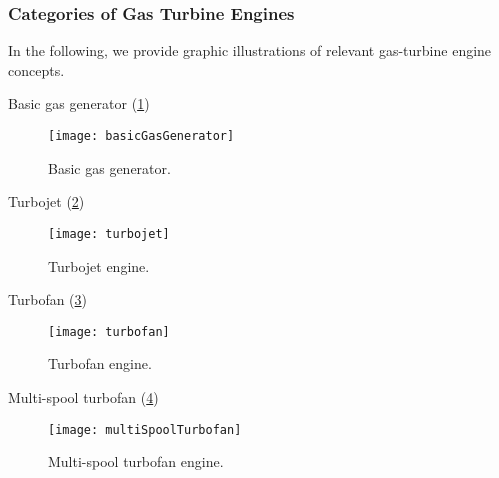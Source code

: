 \subsubsection{Categories of Gas Turbine Engines}
In the following, we provide graphic illustrations of relevant gas-turbine engine concepts.
\begin{itemizePacked}
\item Basic gas generator (\cref{FIG_BASIC_GAS_GENERATOR})

\begin{figure}[!h!]
 \centering
    {\texttt{[image: basicGasGenerator]}}
    \caption{\label{FIG_BASIC_GAS_GENERATOR}Basic gas generator.}
\end{figure}

\item Turbojet (\cref{FIG_TURBOJET})

\begin{figure}[!htb!]
 \centering
    {\texttt{[image: turbojet]}}
    \caption{\label{FIG_TURBOJET}Turbojet engine.}
\end{figure}

\item Turbofan (\cref{FIG_TURBOFAN})

\begin{figure}[!htb!]
 \centering
    {\texttt{[image: turbofan]}}
    \caption{\label{FIG_TURBOFAN}Turbofan engine.}
\end{figure}

\item Multi-spool turbofan (\cref{FIG_MULTI_TURBOFAN})

\begin{figure}[!htb!]
 \centering
    {\texttt{[image: multiSpoolTurbofan]}}
    \caption{\label{FIG_MULTI_TURBOFAN}Multi-spool turbofan engine.}
\end{figure}


\end{itemizePacked}
